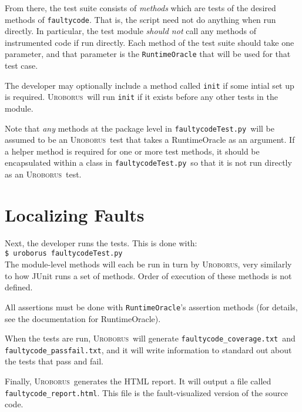\documentclass[english]{article}
\newcommand{\Uro}{\textsc{Uroborus}}
\newcommand{\fc}{\texttt{faultycode}}
\newcommand{\fcT}{\texttt{faultycodeTest.py}}
\newcommand{\fcc}{\texttt{faultycode\_coverage.txt}}
\newcommand{\fcpf}{\texttt{faultycode\_passfail.txt}}
\newcommand{\fch}{\texttt{faultycode\_report.html}}
\begin{document}
From there, the test suite consists of \emph{methods} which are tests of the desired methods of \fc. 
That is, the script need not do anything when run directly. In particular, the test module \emph{should
not} call any methods of instrumented code if run directly. 
Each method of the test suite should take one parameter, and that parameter is the
\texttt{RuntimeOracle} that will be used for that test case.

The developer may optionally include a method called \texttt{init} if some intial set up is
required. \Uro\ will run \texttt{init} if it exists before any other tests in the module.

Note that \emph{any} methods at the package level in \fcT\ will be
assumed to be an \Uro\ test that takes a RuntimeOracle as an argument.
If a helper method is required for one or more test methods, it should
be encapsulated within a class in \fcT\ so that it is not run directly
as an \Uro\ test.

\section{Localizing Faults}

Next, the developer runs the tests. This is done with:\\
 
\texttt{\$ uroborus }\fcT \\

The module-level methods will each be
run in turn by \Uro, very similarly to how JUnit runs a set of methods. Order of execution of these
methods is not defined.

All assertions must be
done with \texttt{RuntimeOracle}'s assertion methods (for details, see the documentation for RuntimeOracle).

When the tests are run, \Uro\
will generate \fcc\ and \fcpf, and it will write information to standard out about the tests that
pass and fail. 

Finally, \Uro\ generates the HTML report. It will output a file called \fch. This file is
the fault-visualized version of the source code.




\end{document}
